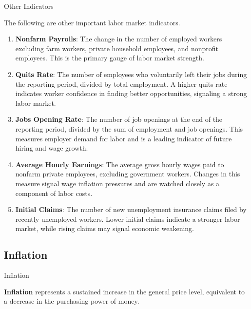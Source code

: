 \documentclass[10pt]{article}
\begin{document}
    \begin{core}{Other Indicators}

      The following are other important labor market indicators.

      \begin{enumerate}

        \item \textbf{Nonfarm Payrolls}: The change in the number of employed workers excluding farm workers, private household employees, and nonprofit employees. This is the primary gauge of labor market strength.

        \item \textbf{Quits Rate}: The number of employees who voluntarily left their jobs during the reporting period, divided by total employment. A higher quits rate indicates worker confidence in finding better opportunities, signaling a strong labor market.

        \item \textbf{Jobs Opening Rate}: The number of job openings at the end of the reporting period, divided by the sum of employment and job openings. This measures employer demand for labor and is a leading indicator of future hiring and wage growth.

        \item \textbf{Average Hourly Earnings}: The average gross hourly wages paid to nonfarm private employees, excluding government workers. Changes in this measure signal wage inflation pressures and are watched closely as a component of labor costs.

        \item \textbf{Initial Claims}: The number of new unemployment insurance claims filed by recently unemployed workers. Lower initial claims indicate a stronger labor market, while rising claims may signal economic weakening.

      \end{enumerate}

    \end{core}

  \subsection{Inflation}
    \label{sec:inflation}

    \begin{core}{Inflation}

      \textbf{Inflation} represents a sustained increase in the general price level, equivalent to a decrease in the purchasing power of money.

    \end{core}
\end{document}
